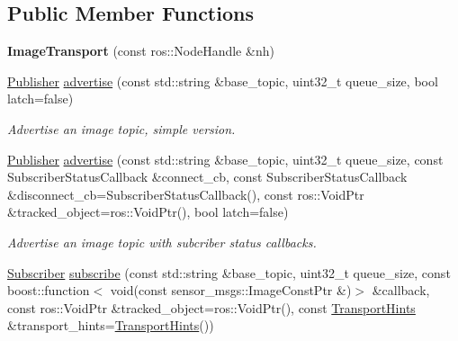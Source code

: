 \subsection*{Public Member Functions}
\begin{DoxyCompactItemize}
\item 
\hypertarget{classimage__transport_1_1_image_transport_aeffb763301848fa9ead353568bb1c150}{{\bfseries Image\-Transport} (const ros\-::\-Node\-Handle \&nh)}\label{classimage__transport_1_1_image_transport_aeffb763301848fa9ead353568bb1c150}

\item 
\hypertarget{classimage__transport_1_1_image_transport_aba83e00cf60977d58ac17c2915f2562b}{\hyperlink{classimage__transport_1_1_publisher}{Publisher} \hyperlink{classimage__transport_1_1_image_transport_aba83e00cf60977d58ac17c2915f2562b}{advertise} (const std\-::string \&base\-\_\-topic, uint32\-\_\-t queue\-\_\-size, bool latch=false)}\label{classimage__transport_1_1_image_transport_aba83e00cf60977d58ac17c2915f2562b}

\begin{DoxyCompactList}\small\item\em Advertise an image topic, simple version. \end{DoxyCompactList}\item 
\hypertarget{classimage__transport_1_1_image_transport_aa66ce930baa92b21a84956b289340671}{\hyperlink{classimage__transport_1_1_publisher}{Publisher} \hyperlink{classimage__transport_1_1_image_transport_aa66ce930baa92b21a84956b289340671}{advertise} (const std\-::string \&base\-\_\-topic, uint32\-\_\-t queue\-\_\-size, const Subscriber\-Status\-Callback \&connect\-\_\-cb, const Subscriber\-Status\-Callback \&disconnect\-\_\-cb=Subscriber\-Status\-Callback(), const ros\-::\-Void\-Ptr \&tracked\-\_\-object=ros\-::\-Void\-Ptr(), bool latch=false)}\label{classimage__transport_1_1_image_transport_aa66ce930baa92b21a84956b289340671}

\begin{DoxyCompactList}\small\item\em Advertise an image topic with subcriber status callbacks. \end{DoxyCompactList}\item 
\hypertarget{classimage__transport_1_1_image_transport_a1c847a2c719c874f84a78a6a60b98c7f}{\hyperlink{classimage__transport_1_1_subscriber}{Subscriber} \hyperlink{classimage__transport_1_1_image_transport_a1c847a2c719c874f84a78a6a60b98c7f}{subscribe} (const std\-::string \&base\-\_\-topic, uint32\-\_\-t queue\-\_\-size, const boost\-::function$<$ void(const sensor\-\_\-msgs\-::\-Image\-Const\-Ptr \&)$>$ \&callback, const ros\-::\-Void\-Ptr \&tracked\-\_\-object=ros\-::\-Void\-Ptr(), const \hyperlink{classimage__transport_1_1_transport_hints}{Transport\-Hints} \&transport\-\_\-hints=\hyperlink{classimage__transport_1_1_transport_hints}{Transport\-Hints}())}\label{classimage__transport_1_1_image_transport_a1c847a2c719c874f84a78a6a60b98c7f}


\end{DoxyCompactItemize}
